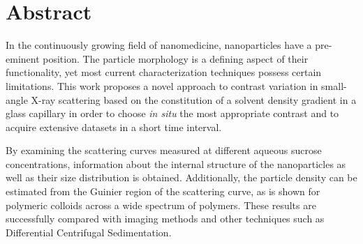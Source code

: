\chapter*{Abstract}
\thispagestyle{empty}



In the continuously growing field of nanomedicine, nanoparticles have a pre-eminent position. The particle morphology is a defining aspect of their functionality, yet most current characterization techniques possess certain limitations. This work proposes a novel approach to contrast variation in small-angle X-ray scattering based on the constitution of a solvent density gradient in a glass capillary in order to choose \emph{in situ} the most appropriate contrast and to acquire extensive datasets in a short time interval.


By examining the scattering curves measured at different aqueous sucrose concentrations, information about the internal structure of the nanoparticles as well as their size distribution is obtained. Additionally, the particle density can be estimated from the Guinier region of the scattering curve, as is shown for polymeric colloids across a wide spectrum of polymers. These results are successfully compared with imaging methods and other techniques such as Differential Centrifugal Sedimentation.

